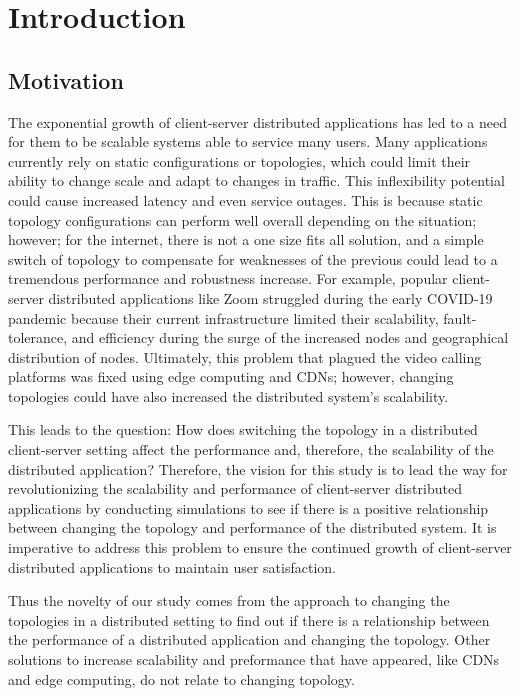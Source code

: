

\section{Introduction}

\subsection{Motivation}

\indent The exponential growth of client-server distributed applications has led to a need for them to be scalable systems able to service many users. Many applications currently rely on static configurations or topologies, which could limit their ability to change scale and adapt to changes in traffic. This inflexibility potential could cause increased latency and even service outages. This is because static topology configurations can perform well overall depending on the situation; however; for the internet, there is not a one size fits all solution, and a simple switch of topology to compensate for weaknesses of the previous could lead to a tremendous performance and robustness increase. For example, popular client-server distributed applications like Zoom struggled during the early COVID-19 pandemic because their current infrastructure limited their scalability, fault-tolerance, and efficiency during the surge of the increased nodes and geographical distribution of nodes. Ultimately, this problem that plagued the video calling platforms was fixed using edge computing and CDNs; however, changing topologies could have also increased the distributed system's scalability.

This leads to the question: How does switching the topology in a distributed client-server setting affect the performance and, therefore, the scalability of the distributed application? Therefore, the vision for this study is to lead the way for revolutionizing the scalability and performance of client-server distributed applications by conducting simulations to see if there is a positive relationship between changing the topology and performance of the distributed system. It is imperative to address this problem to ensure the continued growth of client-server distributed applications to maintain user satisfaction.

Thus the novelty of our study comes from the approach to changing the topologies in a distributed setting to find out if there is a relationship between the performance of a distributed application and changing the topology. Other solutions to increase scalability and preformance that have appeared, like CDNs and edge computing, do not relate to changing topology. 

